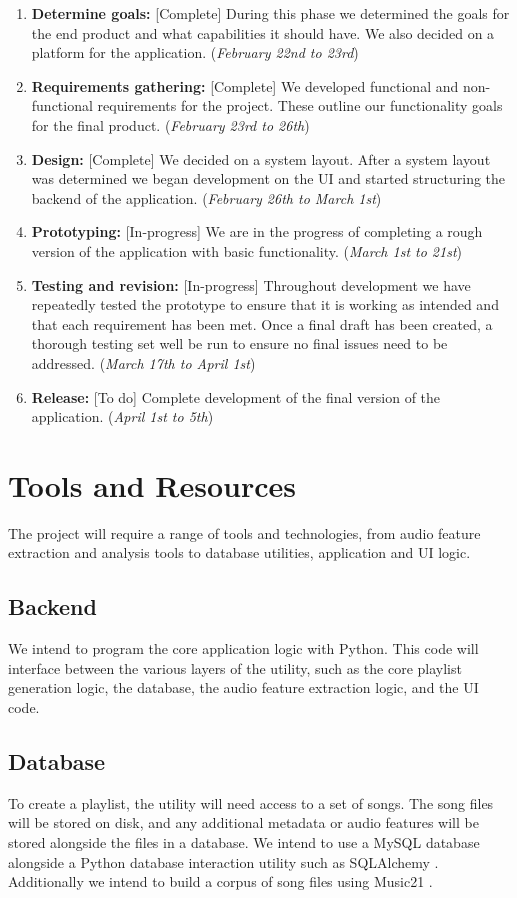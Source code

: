 \documentclass{article}
\begin{document}
\begin{enumerate}
    \item \textbf{Determine goals:} [Complete] During this phase we determined the goals for the end product and what capabilities it should have. We also decided on a platform for the application. ({\it February 22nd to 23rd})
    \item \textbf{Requirements gathering:} [Complete] We developed functional and non-functional requirements for the project. These outline our functionality goals for the final product. ({\it February 23rd to 26th})
    \item \textbf{Design:} [Complete] We decided on a system layout. After a system layout was determined we began development on the UI and started structuring the backend of the application. ({\it February 26th to March 1st})
    \item \textbf{Prototyping:} [In-progress] We are in the progress of completing a rough version of the application with basic functionality. ({\it March 1st to 21st})
    \item \textbf{Testing and revision:} [In-progress] Throughout development we have repeatedly tested the prototype to ensure that it is working as intended and that each requirement has been met. Once a final draft has been created, a thorough testing set well be run to ensure no final issues need to be addressed. ({\it March 17th to April 1st})
    \item \textbf{Release:} [To do] Complete development of the final version of the application. ({\it April 1st to 5th})
\end{enumerate}

\section{Tools and Resources}
The project will require a range of tools and technologies, from audio feature extraction and analysis tools to database utilities, application and UI logic.

\subsection{Backend}
We intend to program the core application logic with Python. This code will interface between the various layers of the utility, such as the core playlist generation logic, the database, the audio feature extraction logic, and the UI code.

\subsection{Database}
To create a playlist, the utility will need access to a set of songs. The song files will be stored on disk, and any additional metadata or audio features will be stored alongside the files in a database. We intend to use a MySQL database alongside a Python database interaction utility such as SQL\-Alchemy \cite{SQLAlchemy}. Additionally we intend to build a corpus of song files using Music21 \cite{Music21}.
\end{document}
